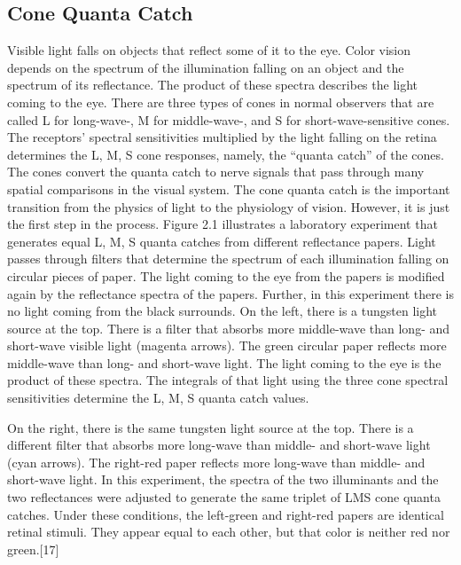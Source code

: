 \subsection{Cone Quanta Catch}
Visible light falls on objects that reflect some of it to the eye. Color vision depends on the spectrum of the illumination falling on an object and the spectrum of its reflectance. The product of these spectra describes the light coming to the eye. There are three types of cones in normal observers that are called L for long-wave-, M for middle-wave-, and S for short-wave-sensitive cones. The receptors’ spectral sensitivities multiplied by the light falling on the retina determines the L, M, S cone responses, namely, the “quanta catch” of the cones. The cones convert the quanta catch to nerve signals that pass through many spatial comparisons in the visual system. The cone quanta catch is the important transition from the physics of light to the physiology of vision. However, it is just the first step in the process.
Figure 2.1 illustrates a laboratory experiment that generates equal L, M, S quanta catches from different reflectance papers.
Light passes through filters that determine the spectrum of each illumination falling on circular pieces of paper. The light coming to the eye from the papers is modified again by the reflectance spectra of the papers. Further, in this experiment there is no light coming from the black surrounds.
On the left, there is a tungsten light source at the top. There is a filter that absorbs more middle-wave than long- and short-wave visible light (magenta arrows). The green circular paper reflects more middle-wave than long- and short-wave light. The light coming to the eye is the product of these spectra. The integrals of that light using the three cone spectral sensitivities determine the L, M, S quanta catch values.




On the right, there is the same tungsten light source at the top. There is a different filter that absorbs more long-wave than middle- and short-wave light (cyan arrows). The right-red paper reflects more long-wave than middle- and short-wave light. In this experiment, the spectra of the two illuminants and the two reflectances were adjusted to generate the same triplet of LMS cone quanta catches. Under these conditions, the left-green and right-red papers are identical retinal stimuli. They appear equal to each other, but that color is neither red nor green.[17]

